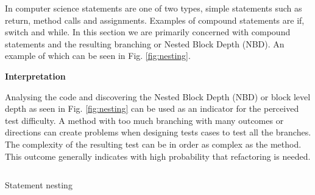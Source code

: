 		\vspace{-5mm}
		\begin{multicols}{2}
			
			\normalsize
			{
				In computer science statements are one of two types, simple statements such as return, method calls and assignments.
				Examples of compound statements are if, switch and while.   In this section we are primarily concerned with compound statements
				and the resulting branching or Nested Block Depth (NBD).  An example of which can be seen in Fig. \ref{fig:nesting}.
				\newline			
			}
			
			\large{\bfseries{Interpretation}}
			\vspace{2mm}
			
			\normalsize
			{
				Analysing the code and discovering the Nested Block Depth (NBD) or block level depth as seen in Fig. \ref{fig:nesting} 
				can be used as an indicator for the perceived test difficulty.
				\newline
				\newline
				A method with too much branching with many outcomes or directions can create problems when designing tests cases to
				test all the branches.  The complexity of the resulting test can be in order as complex as the method.  
				This outcome generally indicates with high probability that refactoring is needed.	
				\newline
			}	
		
			\columnbreak
		
			\begin{figurehere}
				\inputminted[linenos=true,fontsize=\footnotesize,tabsize=2,xleftmargin=1cm]{csharp}{pages/chapter4/smippets/blocks.cs}
				\vspace{-5mm}
				\caption{Statement nesting}
				\label{fig:nesting}
			\end{figurehere}
				
		\end{multicols}
						
